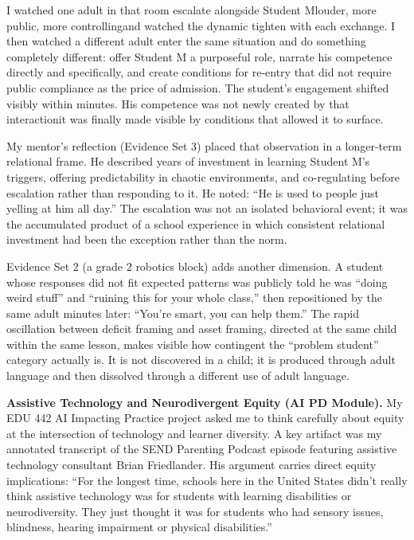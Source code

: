 \documentclass[12pt]{article}
\begin{document}
I watched one adult in that room escalate alongside Student M\textemdash{}louder, more public, more controlling\textemdash{}and watched the dynamic tighten with each exchange. I then watched a different adult enter the same situation and do something completely different: offer Student M a purposeful role, narrate his competence directly and specifically, and create conditions for re-entry that did not require public compliance as the price of admission. The student's engagement shifted visibly within minutes. His competence was not newly created by that interaction\textemdash{}it was finally made visible by conditions that allowed it to surface.

My mentor's reflection (Evidence Set 3) placed that observation in a longer-term relational frame. He described years of investment in learning Student M's triggers, offering predictability in chaotic environments, and co-regulating before escalation rather than responding to it. He noted: ``He is used to people just yelling at him all day.'' The escalation was not an isolated behavioral event; it was the accumulated product of a school experience in which consistent relational investment had been the exception rather than the norm.

Evidence Set 2 (a grade 2 robotics block) adds another dimension. A student whose responses did not fit expected patterns was publicly told he was ``doing weird stuff'' and ``ruining this for your whole class,'' then repositioned by the same adult minutes later: ``You're smart, you can help them.'' The rapid oscillation between deficit framing and asset framing, directed at the same child within the same lesson, makes visible how contingent the ``problem student'' category actually is. It is not discovered in a child; it is produced through adult language and then dissolved through a different use of adult language.

\textbf{Assistive Technology and Neurodivergent Equity (AI PD Module).}
My EDU 442 AI Impacting Practice project asked me to think carefully about equity at the intersection of technology and learner diversity. A key artifact was my annotated transcript of the SEND Parenting Podcast episode featuring assistive technology consultant Brian Friedlander. His argument carries direct equity implications: ``For the longest time, schools here in the United States didn't really think assistive technology was for students with learning disabilities or neurodiversity. They just thought it was for students who had sensory issues, blindness, hearing impairment or physical disabilities.''
\end{document}
